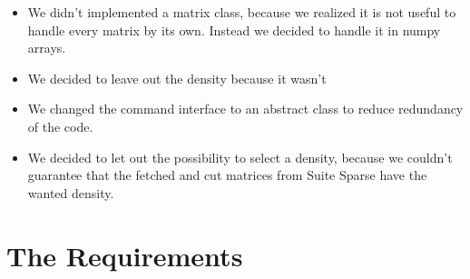 \documentclass[parskip=full]{scrartcl}
\begin{document}
\begin{itemize}

\item We didn't implemented a matrix class, because we realized it is not useful to handle every matrix by its own. 
Instead we decided to handle it in numpy arrays.

\item We decided to leave out the density because it wasn't

\item We changed the command interface to an abstract class to reduce redundancy of the code.

\item We decided to let out the possibility to select a density, because we couldn't guarantee that the fetched and cut matrices from Suite Sparse have the wanted density.

\end{itemize}


\section{The Requirements}
\end{document}
